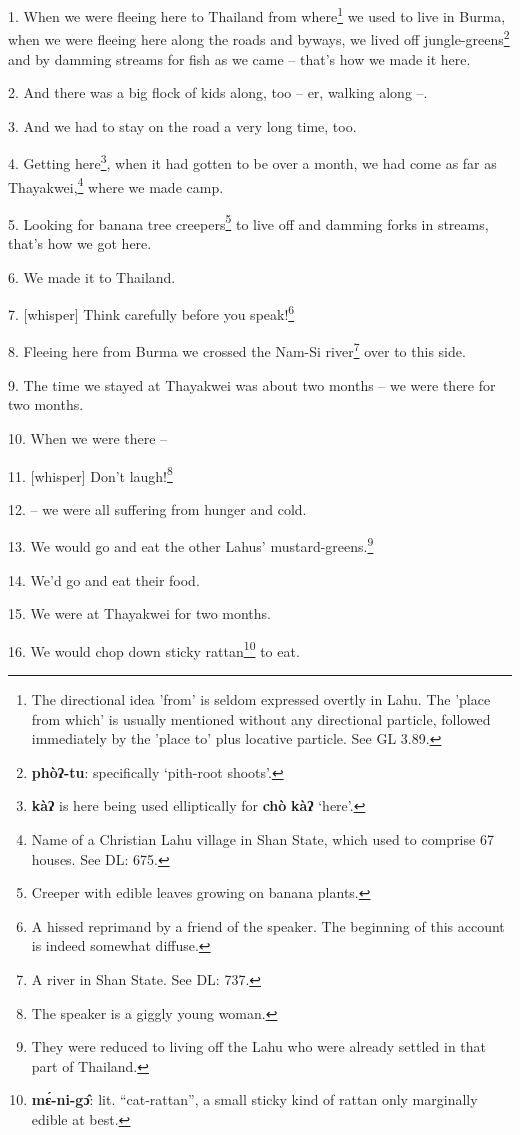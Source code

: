 \setcounter{footnote}{0}

1. When we were fleeing here to Thailand from where\footnote{The directional idea 'from' is seldom expressed overtly in Lahu. The 'place from which' is usually mentioned without any directional particle, followed immediately by the 'place to' plus locative particle. See GL 3.89.} we used to live in Burma,
when we were fleeing here along the roads and byways, we lived off jungle-greens\footnote{\textbf{phòʔ-tu}: specifically `pith-root shoots'.}
and by damming streams for fish as we came -- that's how we made it here.

2. And there was a big flock of kids along, too -- er, walking along --.

3. And we had to stay on the road a very long time, too.

4. Getting here\footnote{\textbf{kàʔ} is here being used elliptically for \textbf{chò} \textbf{kàʔ} `here'.}, when it had gotten to be over a month, we had come as far as
Thayakwei,\footnote{Name of a Christian Lahu village in Shan State, which used to comprise 67 houses. See DL: 675.} where we made camp.

5. Looking for banana tree creepers\footnote{Creeper with edible leaves growing on banana plants.} to live off and damming forks in streams,
that's how we got here.

6. We made it to Thailand.

7. [whisper] Think carefully before you speak!\footnote{A hissed reprimand by a friend of the speaker. The beginning of this account is indeed somewhat diffuse.}

8. Fleeing here from Burma we crossed the Nam-Si river\footnote{A river in Shan State. See DL: 737.} over to this side.

9. The time we stayed at Thayakwei was about two months -- we were there for two
months.

10. When we were there --

11. [whisper] Don't laugh!\footnote{The speaker is a giggly young woman.}

12. -- we were all suffering from hunger and cold.

13. We would go and eat the other Lahus' mustard-greens.\footnote{They were reduced to living off the Lahu who were already settled in that part of Thailand.}

14. We'd go and eat their food.

15. We were at Thayakwei for two months.

16. We would chop down sticky rattan\footnote{\textbf{mɛ́-ni-gɔ̂}: lit. ``cat-rattan'', a small sticky kind of rattan only marginally edible at best.} to eat.


